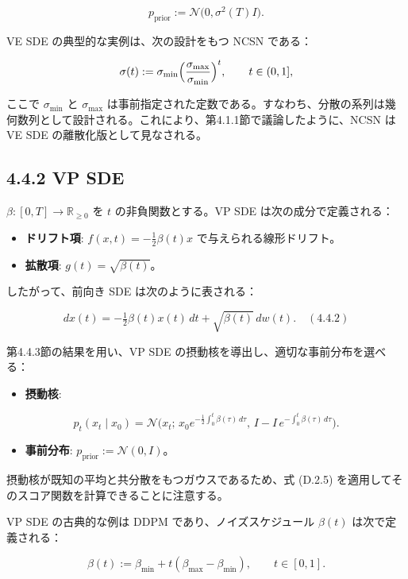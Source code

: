 \[
p_{\mathrm{prior}}:=\mathcal{N}\bigl(0,\sigma^2(T)I\bigr).
\]


VE SDE の典型的な実例は、次の設計をもつ NCSN である：

\[
\sigma(t):=\sigma_{\min}\Bigl(\frac{\sigma_{\max}}{\sigma_{\min}}\Bigr)^{t}, \qquad t\in(0,1],
\]


ここで $\sigma_{\min}$ と $\sigma_{\max}$ は事前指定された定数である。すなわち、分散の系列は幾何数列として設計される。これにより、第4.1.1節で議論したように、NCSN は VE SDE の離散化版として見なされる。

\subsection*{4.4.2 VP SDE}


$\beta:[0,T]\to\mathbb{R}_{\ge 0}$ を $t$ の非負関数とする。VP SDE は次の成分で定義される：

\begin{itemize}
\item \textbf{ドリフト項}: $f(x,t)=-\tfrac12\beta(t)x$ で与えられる線形ドリフト。
\item \textbf{拡散項}: $g(t)=\sqrt{\beta(t)}$。
\end{itemize}


したがって、前向き SDE は次のように表される：

\[
dx(t)=-\tfrac12\beta(t)x(t)\, dt + \sqrt{\beta(t)}\, dw(t). \quad (4.4.2)
\]


第4.4.3節の結果を用い、VP SDE の摂動核を導出し、適切な事前分布を選べる：

\begin{itemize}
\item \textbf{摂動核}:
\end{itemize}

\[
p_t(x_t\mid x_0)
  =\mathcal{N}\Biggl(
  x_t;\,
  x_0 e^{-\tfrac12\int_0^t\beta(\tau)\,d\tau},\,
  I - I\, e^{-\int_0^t\beta(\tau)\,d\tau}
  \Biggr).
\]


\begin{itemize}
\item \textbf{事前分布}: $p_{\mathrm{prior}}:=\mathcal{N}(0,I)$。
\end{itemize}


摂動核が既知の平均と共分散をもつガウスであるため、式 (D.2.5) を適用してそのスコア関数を計算できることに注意する。

VP SDE の古典的な例は DDPM であり、ノイズスケジュール $\beta(t)$ は次で定義される：

\[
\beta(t):=\beta_{\min}+t(\beta_{\max}-\beta_{\min}), \qquad t\in[0,1].
\]


